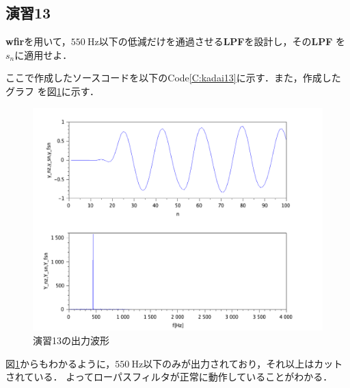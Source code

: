 \documentclass[a4paper,11pt]{jsarticle}
\begin{document}
\subsection{演習13}
\begin{screen}
  \textbf{wfir}を用いて，$\SI{550}{\hertz}$以下の低減だけを通過させる\textbf{LPF}を設計し，その\textbf{LPF}
  を$s_n$に適用せよ．
\end{screen}
ここで作成したソースコードを以下のCode\ref{C:kadai13}に示す．また，作成したグラフ
を図\ref{G:kadai13}に示す．

\begin{figure}[H]
  \centering
  \includegraphics[width=0.8\linewidth]{picture/kadai13.png}
  \caption{演習13の出力波形}
  \label{G:kadai13}
\end{figure}
図\ref{G:kadai13}からもわかるように，$\SI{550}{\hertz}$以下のみが出力されており，それ以上はカットされている．
よってローパスフィルタが正常に動作していることがわかる．
\end{document}
